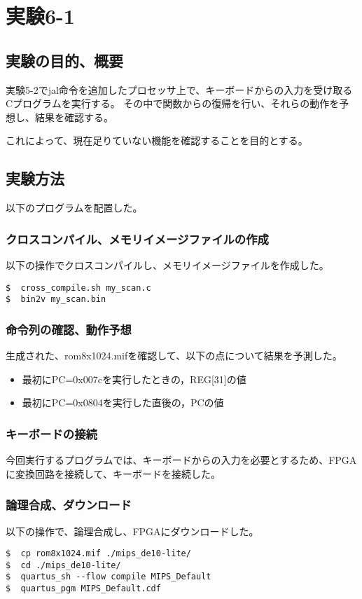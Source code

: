 \section{実験6-1}
\subsection{実験の目的、概要}
実験5-2でjal命令を追加したプロセッサ上で、キーボードからの入力を受け取るCプログラムを実行する。
その中で関数からの復帰を行い、それらの動作を予想し、結果を確認する。

これによって、現在足りていない機能を確認することを目的とする。

\subsection{実験方法}
以下のプログラムを配置した。


\subsubsection{クロスコンパイル、メモリイメージファイルの作成}
以下の操作でクロスコンパイルし、メモリイメージファイルを作成した。
\begin{lstlisting}[caption={クロスコンパイル、メモリイメージファイルの作成},label={クロスコンパイル、メモリイメージファイルの作成5-1}]
$  cross_compile.sh my_scan.c
$  bin2v my_scan.bin
\end{lstlisting}

\subsubsection{命令列の確認、動作予想}
生成された、rom8x1024.mifを確認して、以下の点について結果を予測した。
\begin{itemize}
  \item 最初にPC=0x007cを実行したときの，REG[31]の値
  \item 最初にPC=0x0804を実行した直後の，PCの値
\end{itemize}

\subsubsection{キーボードの接続}
今回実行するプログラムでは、キーボードからの入力を必要とするため、FPGAに変換回路を接続して、キーボードを接続した。

\subsubsection{論理合成、ダウンロード}
以下の操作で、論理合成し、FPGAにダウンロードした。
\begin{lstlisting}[caption={論理合成、ダウンロード},label={論理合成、ダウンロード6-1}]
$  cp rom8x1024.mif ./mips_de10-lite/
$  cd ./mips_de10-lite/
$  quartus_sh --flow compile MIPS_Default
$  quartus_pgm MIPS_Default.cdf
\end{lstlisting}

